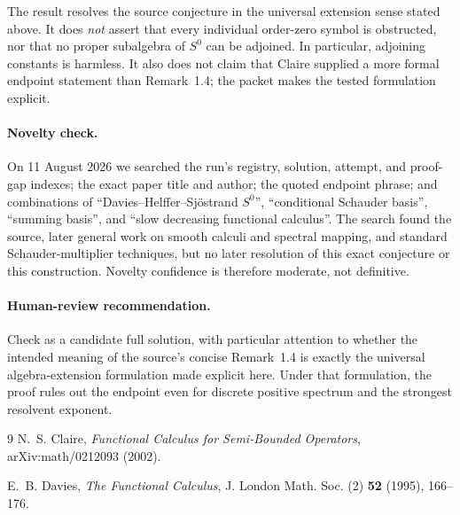 \documentclass[11pt]{article}
\theoremstyle{remark}
\begin{document}
The result resolves the source conjecture in the universal extension sense
stated above.  It does \emph{not} assert that every individual order-zero
symbol is obstructed, nor that no proper subalgebra of $S^0$ can be adjoined.
In particular, adjoining constants is harmless.  It also does not claim that
Claire supplied a more formal endpoint statement than Remark~1.4; the packet
makes the tested formulation explicit.

\paragraph{Novelty check.}
On 11 August 2026 we searched the run's registry, solution, attempt, and
proof-gap indexes; the exact paper title and author; the quoted endpoint
phrase; and combinations of ``Davies--Helffer--Sj\"ostrand $S^0$'',
``conditional Schauder basis'', ``summing basis'', and ``slow decreasing
functional calculus''.  The search found the source, later general work on
smooth calculi and spectral mapping, and standard Schauder-multiplier
techniques, but no later resolution of this exact conjecture or this
construction.  Novelty confidence is therefore moderate, not definitive.

\paragraph{Human-review recommendation.}
Check as a candidate full solution, with particular attention to whether the
intended meaning of the source's concise Remark~1.4 is exactly the universal
algebra-extension formulation made explicit here.  Under that formulation,
the proof rules out the endpoint even for discrete positive spectrum and the
strongest resolvent exponent.

\begin{thebibliography}{9}
N.~S. Claire,
\emph{Functional Calculus for Semi-Bounded Operators},
arXiv:math/0212093 (2002).

E.~B. Davies,
\emph{The Functional Calculus},
J. London Math. Soc. (2) \textbf{52} (1995), 166--176.
\end{thebibliography}
\end{document}
